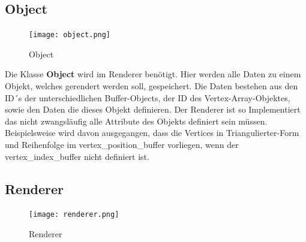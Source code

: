 \subsection{Object}

\begin{figure}[H]
\centering
\texttt{[image: object.png]}
\caption{Object}
\label{fig5}
\end{figure}

\noindent Die Klasse \textbf{Object} wird im Renderer benötigt. Hier werden alle Daten zu einem Objekt, welches gerendert werden soll, gespeichert. Die Daten bestehen aus den ID´s der unterschiedlichen Buffer-Objects, der ID des Vertex-Array-Objektes, sowie den Daten die dieses Objekt definieren. Der Renderer ist so Implementiert das nicht zwangsläufig alle Attribute des Objekts definiert sein müssen. Beispielsweise wird davon ausgegangen, dass die Vertices in Triangulierter-Form und Reihenfolge im vertex\_position\_buffer vorliegen, wenn der vertex\_index\_buffer nicht definiert ist.

\subsection{Renderer}

\begin{figure}[H]
\centering
\texttt{[image: renderer.png]}
\caption{Renderer}
\label{fig6}
\end{figure}

